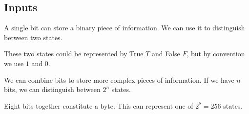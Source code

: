 
\subsection{Inputs}

A single bit can store a binary piece of information. We can use it to distinguish between two states.

These two states could be represented by True \(T\) and False \(F\), but by convention we use \(1\) and \(0\).

We can combine bits to store more complex pieces of information. If we have \(n\) bits, we can distinguish between \(2^n\) states.

Eight bits together constitute a byte. This can represent one of \(2^8=256\) states.

